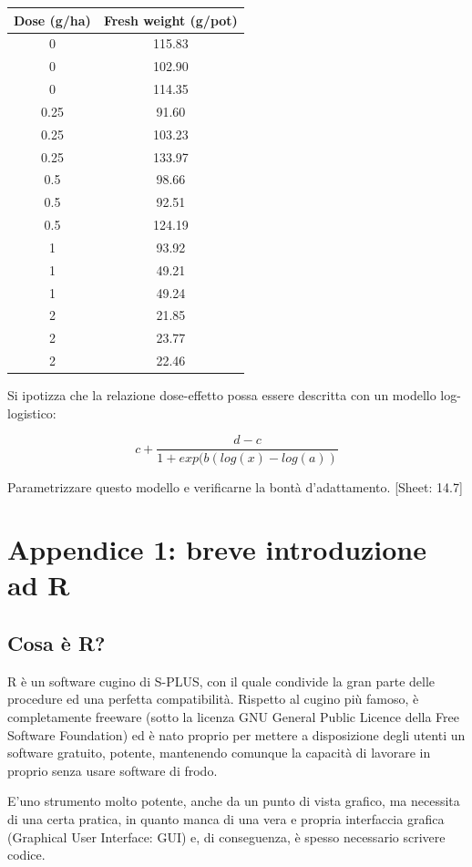 \documentclass[a4paper,12pt,oneside]{book}
\begin{document}
\begin{longtable}[]{@{}cc@{}}
\toprule()
Dose (g/ha) & Fresh weight (g/pot) \\
\midrule()
\endhead
0 & 115.83 \\
0 & 102.90 \\
0 & 114.35 \\
0.25 & 91.60 \\
0.25 & 103.23 \\
0.25 & 133.97 \\
0.5 & 98.66 \\
0.5 & 92.51 \\
0.5 & 124.19 \\
1 & 93.92 \\
1 & 49.21 \\
1 & 49.24 \\
2 & 21.85 \\
2 & 23.77 \\
2 & 22.46 \\
\bottomrule()
\end{longtable}

Si ipotizza che la relazione dose-effetto possa essere descritta con un modello log-logistico:

\[c + \frac{d - c}{1 + exp(b ( log (x) - log (a))}\]

Parametrizzare questo modello e verificarne la bontà d'adattamento.
{[}Sheet: 14.7{]}

\hypertarget{appendice-1-breve-introduzione-ad-r}{%
\chapter{Appendice 1: breve introduzione ad R}\label{appendice-1-breve-introduzione-ad-r}}

\hypertarget{cosa-uxe8-r}{%
\section*{Cosa è R?}\label{cosa-uxe8-r}}

R è un software cugino di S-PLUS, con il quale condivide la gran parte delle procedure ed una perfetta compatibilità. Rispetto al cugino più famoso, è completamente freeware (sotto la licenza GNU General Public Licence della Free Software Foundation) ed è nato proprio per mettere a disposizione degli utenti un software gratuito, potente, mantenendo comunque la capacità di lavorare in proprio senza usare software di frodo.

E'uno strumento molto potente, anche da un punto di vista grafico, ma necessita di una certa pratica, in quanto manca di una vera e propria interfaccia grafica (Graphical User Interface: GUI) e, di conseguenza, è spesso necessario scrivere codice.
\end{document}
